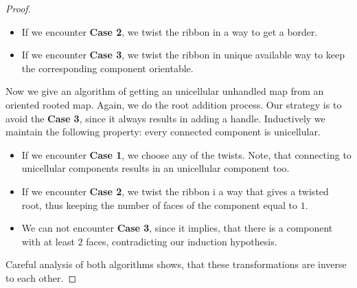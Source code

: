 \documentclass{article}
\begin{document}
\begin{proof}
\begin{itemize}
		\item If we encounter \textbf{Case 2}, we twist the ribbon in a way to get a border.
		
		\item If we encounter \textbf{Case 3}, we twist the ribbon in unique available way to keep the corresponding component orientable. 
	\end{itemize}

	Now we give an algorithm of getting an unicellular unhandled map from an oriented rooted map. Again, we do the root addition process. Our strategy is to avoid the \textbf{Case 3}, since it always results in adding a handle. Inductively we maintain the following property: every connected component is unicellular.
	
	\begin{itemize}
		\item If we encounter \textbf{Case 1}, we choose any of the twists. Note, that connecting to unicellular components results in an unicellular component too.
		
		\item If we encounter \textbf{Case 2}, we twist the ribbon i a way that gives a twisted root, thus keeping the number of faces of the component equal to $1$.
		
		\item We can not encounter \textbf{Case 3}, since it implies, that there is a component with at least $2$ faces, contradicting our induction hypothesis.
	\end{itemize}

	Careful analysis of both algorithms shows, that these transformations are inverse to each other.
\end{proof}
\end{document}
